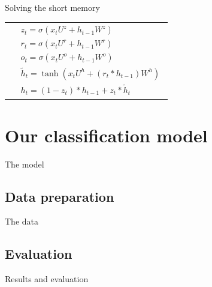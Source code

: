 \documentclass[9pt]{beamer}
\begin{document}
\begin{frame}{Solving the short memory}
{\begin{center}
\begin{tabular}{ c  m{5cm} }
				& $$
					\begin{array}{l} 
						z_t = \sigma\left( x_t U^z + h_{t-1} W^z\right) \\
						r_t = \sigma\left( x_t U^r + h_{t-1} W^r\right) \\
						o_t = \sigma\left( x_t U^o + h_{t-1} W^o\right) \\
						\widetilde{h}_t = \tanh \left( x_t U^h +(r_t \ast h_{t-1}) W^h \right)\\
						h_t =  \left( 1-z_t \right) \ast h_{t-1} + z_t \ast \widetilde{h}_t
					\end{array} 
				$$ \\
			\end{tabular}
		\end{center}
	}
	
	
\end{frame}


\section{Our classification model}

\begin{frame}{The model}

\end{frame}

\subsection{Data preparation}
\begin{frame}{The data}

\end{frame}


\subsection{Evaluation}
\begin{frame}{Results and evaluation}

\end{frame}
\end{document}
